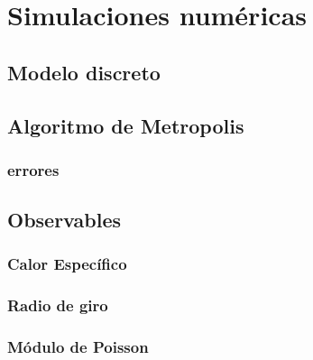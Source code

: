 \chapter{Simulaciones numéricas}

\section{Modelo discreto}

\section{Algoritmo de Metropolis}

\subsection{errores}

\section{Observables}
\subsection{Calor Específico}
\subsection{Radio de giro}
\subsection{Módulo de Poisson}
